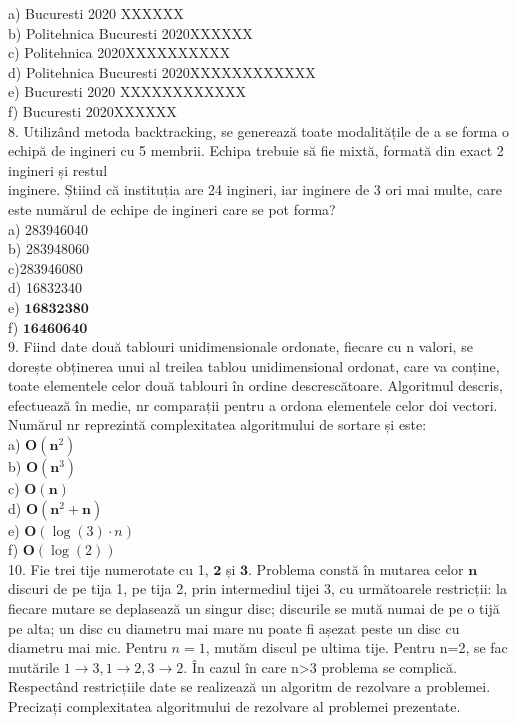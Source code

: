 a) Bucuresti 2020 XXXXXX\\
b) Politehnica Bucuresti 2020XXXXXX\\
c) Politehnica 2020XXXXXXXXXX\\
d) Politehnica Bucuresti 2020XXXXXXXXXXXX\\
e) Bucuresti 2020 XXXXXXXXXXXX\\
f) Bucuresti 2020XXXXXX\\
8. Utilizând metoda backtracking, se generează toate modalitățile de a se forma o echipă de ingineri cu 5 membrii. Echipa trebuie să fie mixtă, formată din exact 2 ingineri și restul\\
inginere. Știind că instituția are 24 ingineri, iar inginere de 3 ori mai multe, care este numărul de echipe de ingineri care se pot forma?\\
a) 283946040\\
b) 283948060\\
c)283946080\\
d) 16832340\\
e) $\mathbf{1 6 8 3 2 3 8 0}$\\
f) $\mathbf{1 6 4 6 0 6 4 0}$\\
9. Fiind date două tablouri unidimensionale ordonate, fiecare cu n valori, se dorește obținerea unui al treilea tablou unidimensional ordonat, care va conține, toate elementele celor două tablouri în ordine descrescătoare. Algoritmul descris, efectuează în medie, nr comparații pentru a ordona elementele celor doi vectori. Numărul nr reprezintă complexitatea algoritmului de sortare și este:\\
a) $\mathbf{O}\left(\mathbf{n}^{2}\right)$\\
b) $\mathbf{O}\left(\mathbf{n}^{3}\right)$\\
c) $\mathbf{O}(\mathbf{n})$\\
d) $\mathbf{O}\left(\mathbf{n}^{2}+\mathbf{n}\right)$\\
e) $\mathbf{O}(\log (3) \cdot n)$\\
f) $\mathbf{O}(\log (2))$\\
10. Fie trei tije numerotate cu 1, $\mathbf{2}$ și $\mathbf{3}$. Problema constă în mutarea celor $\mathbf{n}$ discuri de pe tija 1, pe tija 2, prin intermediul tijei 3, cu următoarele restricții: la fiecare mutare se deplasează un singur disc; discurile se mută numai de pe o tijă pe alta; un disc cu diametru mai mare nu poate fi așezat peste un disc cu diametru mai mic. Pentru $n=1$, mutăm discul pe ultima tije. Pentru n=2, se fac mutările $1 \rightarrow 3,1 \rightarrow 2,3 \rightarrow 2$. În cazul în care n>3 problema se complică. Respectând restricțiile date se realizează un algoritm de rezolvare a problemei. Precizați complexitatea algoritmului de rezolvare al problemei prezentate.\\
